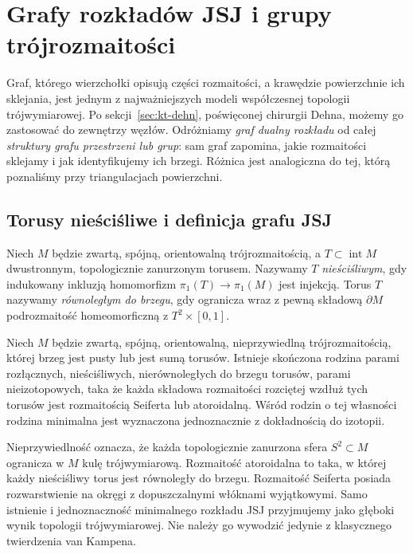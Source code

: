 \chapter{Grafy rozkładów JSJ i grupy trójrozmaitości}
\label{ch:tg-jsj-graphs}

Graf, którego wierzchołki opisują części rozmaitości,
a krawędzie powierzchnie ich sklejania, jest jednym z
najważniejszych modeli współczesnej topologii
trójwymiarowej. Po sekcji~\ref{sec:kt-dehn}, poświęconej
chirurgii Dehna, możemy go zastosować do zewnętrzy węzłów.
Odróżniamy \emph{graf dualny rozkładu}
od całej \emph{struktury grafu przestrzeni lub grup}:
sam graf zapomina, jakie rozmaitości sklejamy i jak
identyfikujemy ich brzegi. Różnica jest analogiczna
do tej, którą poznaliśmy przy triangulacjach powierzchni.

\section{Torusy nieściśliwe i definicja grafu JSJ}
\label{sec:tg-jsj-graph-def}

\begin{definicja}
Niech $M$ będzie zwartą, spójną, orientowalną
trójrozmaitością, a $T\subset\operatorname{int}M$
dwustronnym, topologicznie zanurzonym torusem.  Nazywamy $T$ \emph{nieściśliwym},
gdy indukowany inkluzją homomorfizm
$\pi_1(T)\to\pi_1(M)$ jest injekcją.
Torus $T$ nazywamy \emph{równoległym do brzegu},
gdy ogranicza wraz z pewną składową $\partial M$
podrozmaitość homeomorficzną z $T^2\times[0,1]$.
\end{definicja}

\begin{twierdzenie}
\label{thm:tg-jsj-theorem}
Niech $M$ będzie zwartą, spójną, orientowalną,
nieprzywiedlną trójrozmaitością, której brzeg jest
pusty lub jest sumą torusów. Istnieje skończona
rodzina parami rozłącznych, nieściśliwych,
nierównoległych do brzegu torusów, parami
nieizotopowych, taka że każda składowa rozmaitości
rozciętej wzdłuż tych torusów jest rozmaitością
Seiferta lub atoroidalną. Wśród rodzin o tej
własności rodzina minimalna jest wyznaczona
jednoznacznie z dokładnością do izotopii.
\end{twierdzenie}

\begin{uwaga}
Nieprzywiedlność oznacza, że każda topologicznie zanurzona
sfera $S^2\subset M$ ogranicza w $M$ kulę trójwymiarową. Rozmaitość atoroidalna
to taka, w której każdy nieściśliwy torus jest
równoległy do brzegu. Rozmaitość Seiferta posiada
rozwarstwienie na okręgi z dopuszczalnymi włóknami
wyjątkowymi. Samo istnienie i jednoznaczność
minimalnego rozkładu JSJ przyjmujemy jako głęboki
wynik topologii trójwymiarowej. Nie należy go
wywodzić jedynie z klasycznego twierdzenia
van Kampena.
\end{uwaga}

